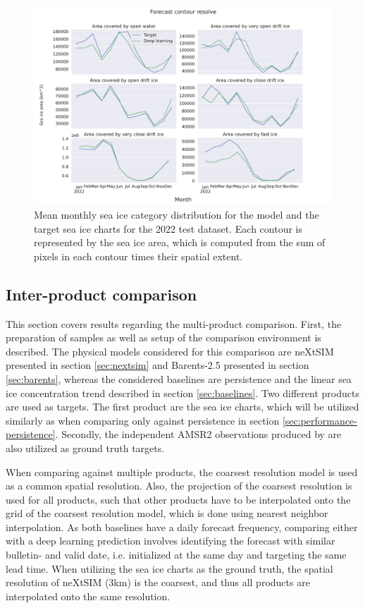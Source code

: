 \documentclass[../main/thesis.tex]{subfiles}
\begin{document}
\begin{figure}
    \centering
    \includegraphics[width=\textwidth]{ice_contour_area}
    \caption{\label{fig:ice-contour-area}Mean monthly sea ice category distribution for the model and the target sea ice charts for the 2022 test dataset. Each contour is represented by the sea ice area, which is computed from the sum of pixels in each contour times their spatial extent.}
\end{figure}


\subsection{Inter-product comparison}
\label{sec:interproduct-compare}
This section covers results regarding the multi-product comparison. First, the preparation of samples as well as setup of the comparison environment is described. The physical models considered for this comparison are neXtSIM \citep{Williams2021} presented in section \ref{sec:nextsim} and Barents-2.5 \citep{Roehrs2022} presented in section \ref{sec:barents}, whereas the considered baselines are persistence and the linear sea ice concentration trend described in section \ref{sec:baselines}. Two different products are used as targets. The first product are the sea ice charts, which will be utilized similarly as when comparing only against persistence in section \ref{sec:performance-persistence}. Secondly, the independent AMSR2 observations produced by \citet{Spreen2008} are also utilized as ground truth targets.

When comparing against multiple products, the coarsest resolution model is used as a common spatial resolution. Also, the projection of the coarsest resolution is used for all products, such that other products have to be interpolated onto the grid of the coarsest resolution model, which is done using nearest neighbor interpolation. As both baselines have a daily forecast frequency, comparing either with a deep learning prediction involves identifying the forecast with similar bulletin- and valid date, i.e. initialized at the same day and targeting the same lead time. When utilizing the sea ice charts as the ground truth, the spatial resolution of neXtSIM (3km) is the coarsest, and thus all products are interpolated onto the same resolution.
\end{document}
